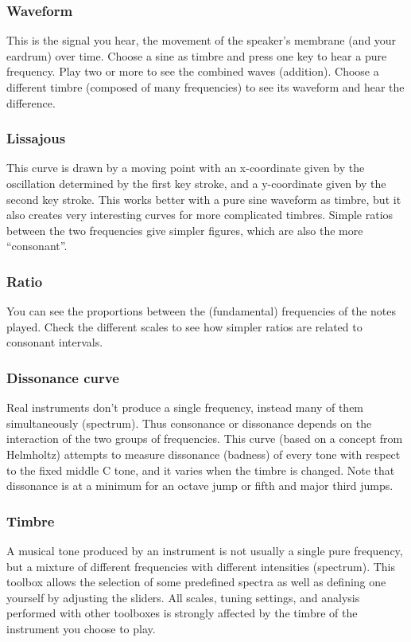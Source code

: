 \subsubsection{Waveform}
This is the signal you hear, the movement of the speaker's membrane (and your eardrum) over time. Choose a sine as timbre and press one key to hear a pure frequency. Play two or more to see the combined waves (addition). Choose a different timbre (composed of many frequencies) to see its waveform and hear the difference.

\subsubsection{Lissajous}
This curve is drawn by a moving point with an x-coordinate given by the oscillation determined by the first key stroke, and a y-coordinate given by the second key stroke. This works better with a pure sine waveform as timbre, but it also creates very interesting curves for more complicated timbres. Simple ratios between the two frequencies give simpler figures, which are also the more ``consonant''.

\subsubsection{Ratio}
You can see the proportions between the (fundamental) frequencies of the notes played. Check the different scales to see how simpler ratios are related to consonant intervals.

\subsubsection{Dissonance curve}
Real instruments don't produce a single frequency, instead many of them simultaneously (spectrum). Thus consonance or dissonance depends on the interaction of the two groups of frequencies. This curve (based on a concept from Helmholtz) attempts to measure dissonance (badness) of every tone with respect to the fixed middle C tone, and it varies when the timbre is changed. Note that dissonance is at a minimum for an octave jump or fifth and major third jumps.

\subsubsection{Timbre}
A musical tone produced by an instrument is not usually a single pure frequency, but a mixture of different frequencies with different intensities (spectrum). This toolbox allows the selection of  some predefined spectra as well as defining one yourself by adjusting the sliders. All scales, tuning settings, and analysis performed with other toolboxes is strongly affected by the timbre of the instrument you choose to play.

